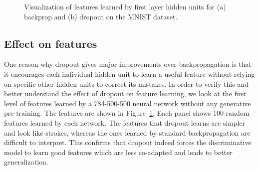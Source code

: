 \documentclass[12pt]{article}
\begin{document}
\begin{figure}[ht]
\centerline{
}
\caption{Visualization of features learned by first layer hidden units for (a)
backprop and (b) dropout on the MNIST dataset.}
\label{fig:features}
\end{figure}
\subsection{Effect on features}
One reason why dropout gives major improvements over backpropagation is that it encourages each individual
hidden unit to learn a useful feature without relying on specific other hidden units to
correct its mistakes.  In order to verify this and better understand the effect
of dropout on feature learning, we look at the first level of features learned by a 784-500-500
neural network without any generative pre-training. The features are shown in Figure~\ref{fig:features}. Each panel shows 100 random
features learned by each network. The features that dropout
learns are simpler and look like strokes, whereas the ones learned by 
standard backpropagation are difficult to interpret. This
confirms that dropout indeed forces the discriminative model to learn
good features which are less co-adapted and leads to better generalization.
\end{document}
